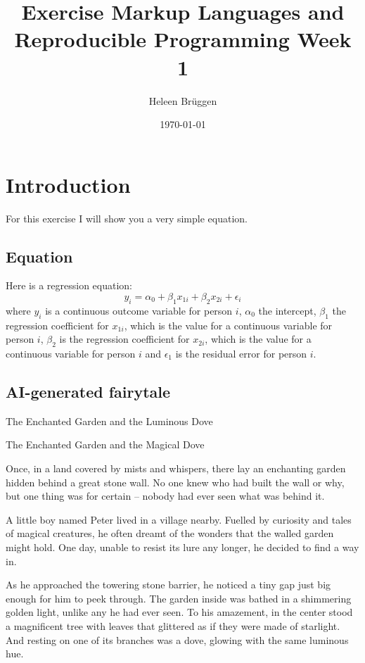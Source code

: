 \documentclass[10pt, a4paper, titlepage]{article}
\title{Exercise Markup Languages and Reproducible Programming Week 1}
\author{Heleen Brüggen}
\date{\today}
\begin{document}
\maketitle
\newpage

\section{Introduction}

For this exercise I will show you a very simple equation.

\subsection{Equation}
Here is a regression equation: 
\begin{equation} 
y_i = \alpha_0 + \beta_1 x_{1i} + \beta_2 x_{2i} + \epsilon_i 
\end{equation}
where $y_i$ is a continuous outcome variable for person $i$, $\alpha_0$ the intercept, $\beta_1$ the regression coefficient for $x_{1i}$, which is the value for a continuous variable for person $i$,  $\beta_2$ is the regression coefficient for $x_{2i}$, which is the value for a continuous variable for person $i$ and $\epsilon_1$ is the residual error for person $i$. 

\subsection{AI-generated fairytale}
The Enchanted Garden and the Luminous Dove

The Enchanted Garden and the Magical Dove

Once, in a land covered by mists and whispers, there lay an enchanting garden hidden behind a great stone wall. No one knew who had built the wall or why, but one thing was for certain – nobody had ever seen what was behind it.

A little boy named Peter lived in a village nearby. Fuelled by curiosity and tales of magical creatures, he often dreamt of the wonders that the walled garden might hold. One day, unable to resist its lure any longer, he decided to find a way in.

As he approached the towering stone barrier, he noticed a tiny gap just big enough for him to peek through. The garden inside was bathed in a shimmering golden light, unlike any he had ever seen. To his amazement, in the center stood a magnificent tree with leaves that glittered as if they were made of starlight. And resting on one of its branches was a dove, glowing with the same luminous hue.
\end{document}
